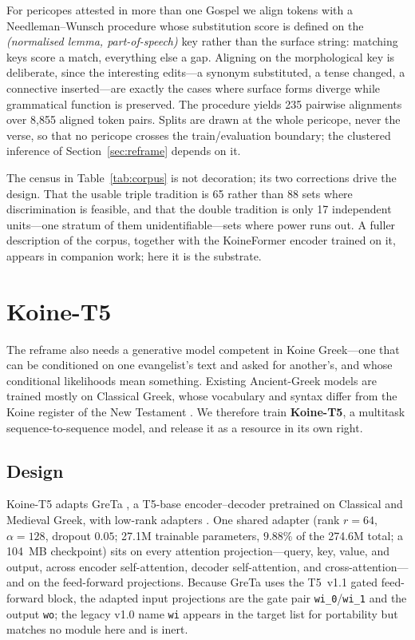 \documentclass[11pt,letterpaper]{article}
\begin{document}
For pericopes attested in more than one Gospel we align tokens with a Needleman--Wunsch procedure whose substitution score is defined on the \emph{(normalised lemma, part-of-speech)} key rather than the surface string: matching keys score a match, everything else a gap. Aligning on the morphological key is deliberate, since the interesting edits---a synonym substituted, a tense changed, a connective inserted---are exactly the cases where surface forms diverge while grammatical function is preserved. The procedure yields 235 pairwise alignments over 8{,}855 aligned token pairs. Splits are drawn at the whole pericope, never the verse, so that no pericope crosses the train/evaluation boundary; the clustered inference of Section~\ref{sec:reframe} depends on it.

The census in Table~\ref{tab:corpus} is not decoration; its two corrections drive the design. That the usable triple tradition is 65 rather than 88 sets where discrimination is feasible, and that the double tradition is only 17 independent units---one stratum of them unidentifiable---sets where power runs out. A fuller description of the corpus, together with the KoineFormer encoder trained on it, appears in companion work; here it is the substrate.

\section{Koine-T5}
\label{sec:model}

The reframe also needs a generative model competent in Koine Greek---one that can be conditioned on one evangelist's text and asked for another's, and whose conditional likelihoods mean something. Existing Ancient-Greek models are trained mostly on Classical Greek, whose vocabulary and syntax differ from the Koine register of the New Testament \citep{gururangan2020}. We therefore train \textbf{Koine-T5}, a multitask sequence-to-sequence model, and release it as a resource in its own right.

\subsection{Design}

Koine-T5 adapts GreTa \citep{riemenschneider2023}, a T5-base \citep{raffel2020} encoder--decoder pretrained on Classical and Medieval Greek, with low-rank adapters \citep{hu2021lora}. One shared adapter (rank $r=64$, $\alpha=128$, dropout $0.05$; 27.1M trainable parameters, $9.88\%$ of the 274.6M total; a 104~MB checkpoint) sits on every attention projection---query, key, value, and output, across encoder self-attention, decoder self-attention, and cross-attention---and on the feed-forward projections. Because GreTa uses the T5~v1.1 gated feed-forward block, the adapted input projections are the gate pair \texttt{wi\_0}/\texttt{wi\_1} and the output \texttt{wo}; the legacy v1.0 name \texttt{wi} appears in the target list for portability but matches no module here and is inert.
\end{document}
